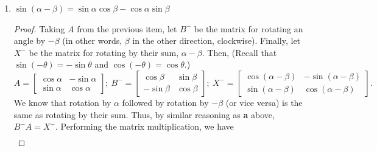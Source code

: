 \documentclass{article}
\begin{document}
\begin{enumerate}
\begin{enumerate}
\begin{proof}
\begin{align*}
            \end{align*} Setting this to be equal to \(X\) and rearranging some terms,\[
                \begin{bmatrix}
                    \cos\alpha\cos\beta - \sin\alpha\sin\beta&-\sin\alpha\cos\beta-\cos\alpha\sin\beta \\ 
                    \colorbox{Periwinkle!42}{\(\sin\alpha\cos\beta + \cos\alpha\sin\beta\)}& -\sin\alpha\sin\beta + \cos\alpha\cos\beta
                \end{bmatrix} = \begin{bmatrix}
                    \cos(\alpha + \beta)&-\sin(\alpha + \beta) \\ \colorbox{Periwinkle!42}{\(\sin(\alpha+\beta)\)}&\cos(\alpha + \beta)
                \end{bmatrix} 
            \] gives us \(\sin(\alpha + \beta) = \sin\alpha\cos\beta + \cos\alpha\sin\beta\), which proves the identity. 
        \end{proof}
        \item \(\sin(\alpha - \beta) = \sin\alpha\cos\beta - \cos\alpha\sin\beta\)\begin{proof}
            Taking \(A\) from the previous item, let \(B^-\) be the matrix for rotating an angle by \(-\beta\) (in other words, \(\beta\) in the other direction, clockwise). Finally, let \(X^-\) be the matrix for rotating by their sum, \(\alpha -\beta\). Then, 
            (Recall that \(\sin(-\theta) = -\sin\theta\) and \(\cos(-\theta) = \cos\theta\).)\[
                A = \begin{bmatrix}
                    \cos\alpha&-\sin\alpha \\ \sin\alpha&\cos\alpha
                \end{bmatrix};~B^- = \begin{bmatrix}
                    \cos\beta&\sin\beta \\ -\sin\beta&\cos\beta
                \end{bmatrix};~X^- =  \begin{bmatrix}
                    \cos(\alpha - \beta)&-\sin(\alpha - \beta) \\ \sin(\alpha-\beta)&\cos(\alpha - \beta)
                \end{bmatrix}.
            \] We know that rotation by \(\alpha\) followed by rotation by \(-\beta\) (or vice versa) is the same as rotating by their sum. Thus, by similar reasoning as \textbf{a} above, \(B^-A = X^-\). Performing the matrix multiplication, we have\begin{align*} 

\end{align*}
\end{proof}
\end{enumerate}
\end{enumerate}
\end{document}
